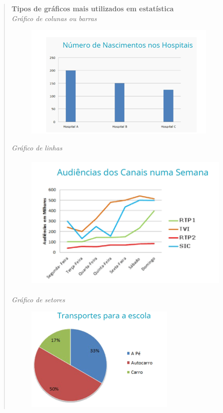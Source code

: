 \begin{quote}
\noindent\textbf{Tipos de gráficos mais utilizados em estatística}\\

\noindent\textit{Gráfico de colunas ou barras}\\

\begin{figure}
\includegraphics[width=3.71875in,height=2.20833in]{./imgSAEB_6_MAT/media/image77.png}
\end{figure}

\noindent\textit{Gráfico de linhas}\\


\begin{figure}
\includegraphics[width=4.1875in,height=2.6875in]{./imgSAEB_6_MAT/media/image79.png}
\end{figure}

\noindent\textit{Gráfico de setores}\\

\begin{figure}
\includegraphics[width=2.88542in,height=2.03125in]{./imgSAEB_6_MAT/media/image80.png}
\end{figure}
\end{quote}

